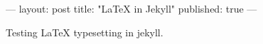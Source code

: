 ---
layout: post
title: "LaTeX in Jekyll"
published: true
---

Testing \LaTeX{} typesetting in jekyll.
